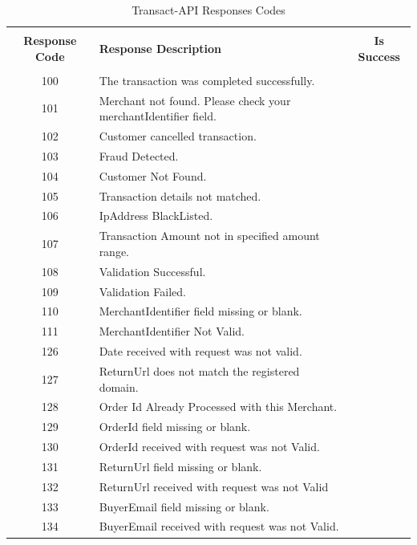 \documentclass{article}
\newcommand{\cmark}{\ding{51}}
\newcommand{\xmark}{\ding{55}}
\begin{document}
\begin{longtable}{||c|p{12.5cm}||c|}
\rowcolor{white}
\caption{Transact-API Responses Codes}\\
\rowcolor{green!50}
\bfseries{Response Code} & \bfseries{Response Description} & \bfseries{Is Success} \\ \hline & & \\
100 &The transaction was completed successfully.& \textcolor{green} {\cmark} \\
101 &Merchant not found. Please check your merchantIdentifier field.& \textcolor{red} {\xmark} \\
102 &Customer cancelled transaction.& \textcolor{red} {\xmark} \\
103 &Fraud Detected.& \textcolor{red} {\xmark} \\
104 &Customer Not Found.& \textcolor{red} {\xmark} \\
105 &Transaction details not matched.& \textcolor{red} {\xmark} \\
106 &IpAddress BlackListed.& \textcolor{red} {\xmark} \\
107 &Transaction Amount not in specified amount range.& \textcolor{red} {\xmark} \\
108 &Validation Successful.& \textcolor{red} {\xmark} \\
109 &Validation Failed.& \textcolor{red} {\xmark} \\
110 &MerchantIdentifier field missing or blank.& \textcolor{red} {\xmark} \\
111 &MerchantIdentifier Not Valid.& \textcolor{red} {\xmark} \\
126 &Date received with request was not valid.& \textcolor{red} {\xmark} \\
127 &ReturnUrl does not match the registered domain.& \textcolor{red} {\xmark} \\
128 &Order Id Already Processed with this Merchant.& \textcolor{red} {\xmark} \\
129 &OrderId field missing or blank.& \textcolor{red} {\xmark} \\
130 &OrderId received with request was not Valid.& \textcolor{red} {\xmark} \\
131 &ReturnUrl field missing or blank.& \textcolor{red} {\xmark} \\
132 &ReturnUrl received with request was not Valid& \textcolor{red} {\xmark} \\
133 &BuyerEmail field missing or blank.& \textcolor{red} {\xmark} \\
134 &BuyerEmail received with request was not Valid.& \textcolor{red} {\xmark} \\

\end{longtable}
\end{document}
